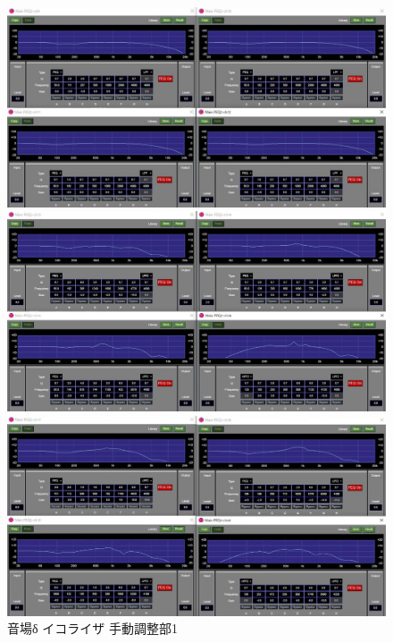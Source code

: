 \documentclass[11pt,a4j]{jreport}
\begin{document}
\begin{figure}[H]
  \begin{minipage}[b]{.5\linewidth}
    \centering
    \includegraphics[width=.9\linewidth]{images/experimentField/afcParameters/04delta/04manualEQ3.jpg}
  \end{minipage}%
  \begin{minipage}[b]{.5\linewidth}
    \centering
    \includegraphics[width=.9\linewidth]{images/experimentField/afcParameters/04delta/04manualEQ4.jpg}
  \end{minipage}

  \begin{minipage}[b]{1\linewidth}
    \centering
    \includegraphics[width=.45\linewidth]{images/experimentField/afcParameters/04delta/04manualEQ5.jpg}
  \end{minipage}

  \centering
  \caption{音場δ イコライザ 手動調整部1}
  \label{fig:deltaイコライザ手動調整部1}
\end{figure}
\newpage
\end{document}
